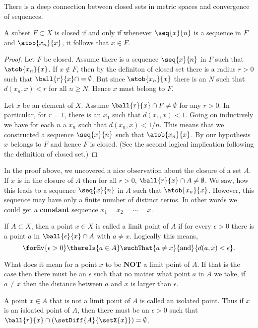 There is a deep connection between closed sets in metric spaces and convergence of sequences.
\begin{Proposition}
    A subset $F\subset X$ is closed if and only if whenever $\seq{x}{n}$ is a sequence in $F$ and
    $\atob{x_n}{x}$, it follows that $x \in F$.
\end{Proposition}
\begin{proof}
    Let $F$ be closed. Assume there is a sequence $\seq{x}{n}$ in $F$ such that $\atob{x_n}{x}$. If $x \not
    \in F$, then by the definiton of closed set there is a radius $r > 0$ such that $\ball{r}{x}\cap
    =\emptyset$. But since $\atob{x_n}{x}$ there is an $N$ such that $d(x_n,x) < r$ for all $n \geq N$. Hence
    $x$ must belong to $F$.

    Let $x$ be an element of $X$. Assume $\ball{r}{x}\cap F \neq \emptyset$ for any $r > 0$. In particular, 
    for $ r = 1$, there is an $x_1$
    such that $d(x_{1},x) < 1$. Going on inductively we have for each $n$ a $x_n$ such that $d(x_{n},x) < 1/n$.
    This means that we constructed a sequence $\seq{x}{n}$ such that $\atob{x_n}{x}$. By our hypothesis $x$
    belongs to $F$ and hence $F$ is closed. (See the second logical implication following the definition of
    closed set.)
\end{proof}
\begin{Remark}
    In the proof above, we uncovered a nice observation about the closure of a set $A$. If $x$ is in the
    closure of $A$ then for all $r > 0$, $\ball{r}{x}\cap A \neq \emptyset$. We saw, how this leads to a
    sequence $\seq{x}{n}$ in $A$ such that $\atob{x_n}{x}$. However, this sequence may have only a finite
    number of distinct terms. In other words we could get a \textbf{constant} sequence $x_1 = x_2 = \cdots =
    x$.
\end{Remark}
\begin{Definition}[name=Limit point]
    If $A \subset X$, then a point $x \in X$ is called a limit point of $A$ if for every $\epsilon > 0$ there
    is a point $a$ in $\ball{\epsilon}{x}\cap A$ with $a \neq x$. Logically this means,
    \[\forEv{\epsilon > 0}\thereIs{a \in A}\suchThat{a\neq x}{\text{and}}{d(a,x) < \epsilon }.\]
\end{Definition}
What does it mean for a point $x$ to be \textbf{NOT} a limit point of $A$. If that is the case then there must
be an $\epsilon$ such that no matter what point $a$ in $A$ we take, if $a \neq x$ then the distance between
$a$ and $x$ is larger than $\epsilon$.
\begin{Definition}[name=Isolated point]
    A point $x \in A$ that is not a limit point of $A$ is called an isolated point. Thus if $x$ is an isloated
    point of $A$, then there must be an
    $\epsilon > 0$ such that $\ball{r}{x}\cap (\setDiff{A}{\setX{x}}) = \emptyset$.
\end{Definition}
